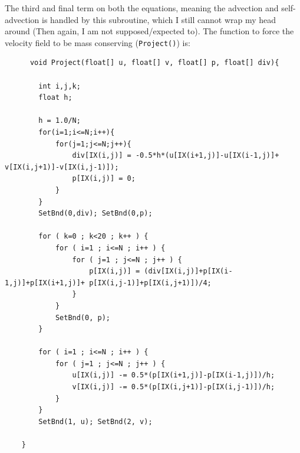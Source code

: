 \documentclass[12pt,a4paper]{book}
\begin{document}
The third and final term on both the equations, meaning the advection and self-advection is handled by this subroutine, which I still cannot wrap my head around (Then again, I am not supposed/expected to). The function to force the velocity field to be mass conserving (\verb|Project()|) is:
\begin{lstlisting}
	  void Project(float[] u, float[] v, float[] p, float[] div){
		
		int i,j,k;
		float h;
		
		h = 1.0/N;
		for(i=1;i<=N;i++){
			for(j=1;j<=N;j++){
				div[IX(i,j)] = -0.5*h*(u[IX(i+1,j)]-u[IX(i-1,j)]+ v[IX(i,j+1)]-v[IX(i,j-1)]);
				p[IX(i,j)] = 0;
			}
		}
		SetBnd(0,div); SetBnd(0,p);
		
		for ( k=0 ; k<20 ; k++ ) {
			for ( i=1 ; i<=N ; i++ ) {
				for ( j=1 ; j<=N ; j++ ) {
					p[IX(i,j)] = (div[IX(i,j)]+p[IX(i-1,j)]+p[IX(i+1,j)]+ p[IX(i,j-1)]+p[IX(i,j+1)])/4;
				}
			}
			SetBnd(0, p);
		}
		
		for ( i=1 ; i<=N ; i++ ) {
			for ( j=1 ; j<=N ; j++ ) {
				u[IX(i,j)] -= 0.5*(p[IX(i+1,j)]-p[IX(i-1,j)])/h;
				v[IX(i,j)] -= 0.5*(p[IX(i,j+1)]-p[IX(i,j-1)])/h;
			}
		}
		SetBnd(1, u); SetBnd(2, v);
		
	}
\end{lstlisting}
\end{document}
